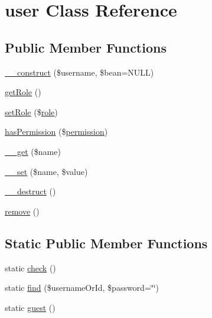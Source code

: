 \hypertarget{classcommon_1_1user_1_1legacy_1_1user}{\section{user \-Class \-Reference}
\label{classcommon_1_1user_1_1legacy_1_1user}
}
\subsection*{\-Public \-Member \-Functions}
\begin{DoxyCompactItemize}
\item 
\hyperlink{classcommon_1_1user_1_1legacy_1_1user_a780067f6f38211821423f8447881479e}{\-\_\-\-\_\-construct} (\$username, \$bean=\-N\-U\-L\-L)
\item 
\hyperlink{classcommon_1_1user_1_1legacy_1_1user_a0b2e7098f1c48a7439a42bada5b69689}{get\-Role} ()
\item 
\hyperlink{classcommon_1_1user_1_1legacy_1_1user_aa9233284be00bee150c4982e73785b72}{set\-Role} (\$\hyperlink{classcommon_1_1user_1_1legacy_1_1role}{role})
\item 
\hyperlink{classcommon_1_1user_1_1legacy_1_1user_a4da2a6a1e77331cc90a7d38bba8c442f}{has\-Permission} (\$\hyperlink{classcommon_1_1user_1_1legacy_1_1permission}{permission})
\item 
\hyperlink{classcommon_1_1user_1_1legacy_1_1user_abc8e9e31bb15c8a44c3210ec551407c8}{\-\_\-\-\_\-get} (\$name)
\item 
\hyperlink{classcommon_1_1user_1_1legacy_1_1user_a83c2703c91959192f759992ad5640b67}{\-\_\-\-\_\-set} (\$name, \$value)
\item 
\hyperlink{classcommon_1_1user_1_1legacy_1_1user_a421831a265621325e1fdd19aace0c758}{\-\_\-\-\_\-destruct} ()
\item 
\hyperlink{classcommon_1_1user_1_1legacy_1_1user_aff9a1fb07dca963c2c9a8ffe66b45ded}{remove} ()
\end{DoxyCompactItemize}
\subsection*{\-Static \-Public \-Member \-Functions}
\begin{DoxyCompactItemize}
\item 
static \hyperlink{classcommon_1_1user_1_1legacy_1_1user_a3a934bd1e982502106ee5dfac2e4e2ed}{check} ()
\item 
static \hyperlink{classcommon_1_1user_1_1legacy_1_1user_a74af298c89631db5c7cb8322b337427f}{find} (\$username\-Or\-Id, \$password=\char`\"{}\char`\"{})
\item 
static \hyperlink{classcommon_1_1user_1_1legacy_1_1user_add24390720d880435ddea36f244998c7}{guest} ()
\end{DoxyCompactItemize}
